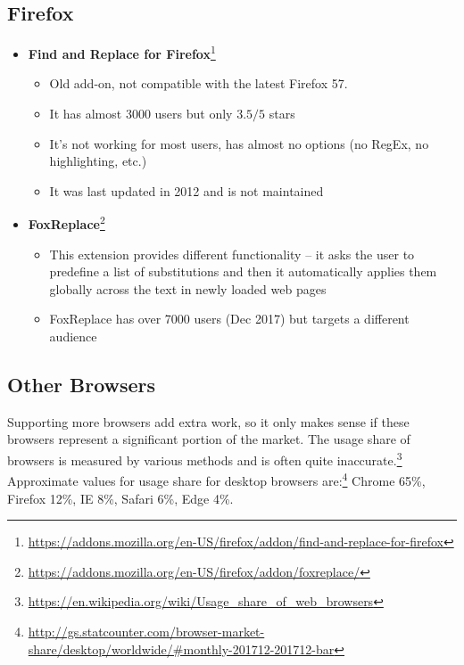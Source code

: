 \documentclass[bsc,frontabs,twoside,singlespacing,parskip,deptreport]{infthesis}
\providecommand{\tightlist}{%
  \setlength{\itemsep}{0pt}\setlength{\parskip}{0pt}}
\begin{document}
\subsection{Firefox}

\begin{itemize}
\item
  \textbf{Find and Replace for Firefox}\footnote{\href{https://addons.mozilla.org/en-US/firefox/addon/find-and-replace-for-firefox}{https://addons.mozilla.org/en-US/firefox/addon/find-and-replace-for-firefox}}
  \begin{itemize}
  \tightlist
\item
  Old add-on, not compatible with the latest Firefox 57.
\item
  It has almost 3000 users but only $3.5/5$ stars
\item
  It's not working for most users, has almost no options (no RegEx, no highlighting, etc.)
\item
  It was last updated in 2012 and is not maintained
  \end{itemize}
\item
  \textbf{FoxReplace}\footnote{\href{https://addons.mozilla.org/en-US/firefox/addon/foxreplace/}{https://addons.mozilla.org/en-US/firefox/addon/foxreplace/}}
  \begin{itemize}
  \tightlist
\item
  This extension provides different functionality -- it asks the user to predefine a list of substitutions and then it automatically applies them globally across the text in newly loaded web pages
\item
  FoxReplace has over 7000 users (Dec 2017) but targets a different audience
  \end{itemize}
\end{itemize}

\subsection{Other Browsers}
Supporting more browsers add extra work, so it only makes sense if these browsers represent a significant portion of the market. The usage share of browsers is measured by various methods and is often quite inaccurate.\footnote{\href{https://en.wikipedia.org/wiki/Usage\_share\_of\_web\_browsers}{https://en.wikipedia.org/wiki/Usage\_share\_of\_web\_browsers}} Approximate values for usage share for desktop browsers are:\footnote{\href{http://gs.statcounter.com/browser-market-share/desktop/worldwide/\#monthly-201712-201712-bar}{http://gs.statcounter.com/browser-market-share/desktop/worldwide/\#monthly-201712-201712-bar}} Chrome 65\%, Firefox 12\%, IE 8\%, Safari 6\%, Edge 4\%.
\end{document}
